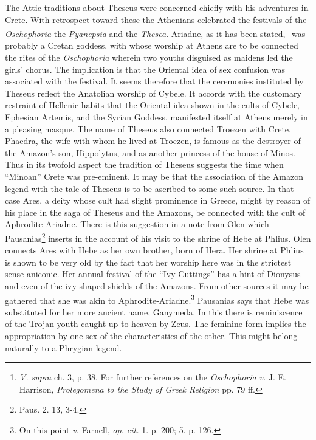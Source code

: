 \documentclass[a4paper, 12pt, oneside]{article}
\begin{document}
The Attic traditions about Theseus were concerned chiefly with his adventures in Crete. With retrospect toward these the Athenians celebrated the festivals of the \emph{Oschophoria} the \emph{Pyanepsia} and the \emph{Thesea}. Ariadne, as it has been stated,\footnote{\emph{V. supra} ch. 3, p. 38. For further references on the \emph{Oschophoria} \emph{v.} J. E. Harrison, \emph{Prolegomena to the Study of Greek Religion} pp. 79 ff.} was probably a Cretan goddess, with whose worship at Athens are to be connected the rites of the \emph{Oschophoria} wherein two youths disguised as maidens led the girls' chorus. The implication is that the Oriental idea of sex confusion was associated with the festival. It seems therefore that the ceremonies instituted by Theseus reflect the Anatolian worship of Cybele. It accords with the customary restraint of Hellenic habits that the Oriental idea shown in the cults of Cybele, Ephesian Artemis, and the Syrian Goddess, manifested itself at Athens merely in a pleasing masque. The name of Theseus also connected Troezen with Crete. Phaedra, the wife with whom he lived at Troezen, is famous as the destroyer of the Amazon's son, Hippolytus, and as another princess of the house of Minos. Thus in its twofold aspect the tradition of Theseus suggests the time when ``Minoan'' Crete was pre-eminent. It may be that the association of the Amazon legend with the tale of Theseus is to be ascribed to some such source. In that case Ares, a deity whose cult had slight prominence in Greece, might by reason of his place in the saga of Theseus and the Amazons, be connected with the cult of Aphrodite-Ariadne. There is this suggestion in a note from Olen which Pausanias\footnote{Paus. 2. 13, 3-4.} inserts in the account of his visit to the shrine of Hebe at Phlius. Olen connects Ares with Hebe as her own brother, born of Hera. Her shrine at Phlius is shown to be very old by the fact that her worship here was in the strictest sense aniconic. Her annual festival of the ``Ivy-Cuttings'' has a hint of Dionysus and even of the ivy-shaped shields of the Amazons. From other sources it may be gathered that she was akin to Aphrodite-Ariadne.\footnote{On this point \emph{v.} Farnell, \emph{op. cit.} 1. p. 200; 5. p. 126.} Pausanias says that Hebe was substituted for her more ancient name, Ganymeda. In this there is reminiscence of the Trojan youth caught up to heaven by Zeus. The feminine form implies the appropriation by one sex of the characteristics of the other. This might belong naturally to a Phrygian legend.
\end{document}

